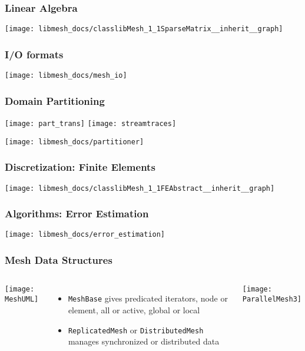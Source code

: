 \frame
{
  \frametitle{Linear Algebra}
  \begin{center}
    \texttt{[image: libmesh\_docs/classlibMesh\_1\_1SparseMatrix\_\_inherit\_\_graph]}
  \end{center}
}



\frame
{
  \frametitle{I/O formats}
  \begin{center}
    \texttt{[image: libmesh\_docs/mesh\_io]}
  \end{center}
}


\frame
{
  \frametitle{Domain Partitioning}
  \begin{center}
    \texttt{[image: part\_trans]}
    \texttt{[image: streamtraces]}
  \end{center}  

  \texttt{[image: libmesh\_docs/partitioner]}
}


\frame
{
  \frametitle{Discretization: Finite Elements}
  \begin{center}
    \texttt{[image: libmesh\_docs/classlibMesh\_1\_1FEAbstract\_\_inherit\_\_graph]}
  \end{center}
}      



\frame
{
  \frametitle{Algorithms: Error Estimation}
  \begin{center}
    \texttt{[image: libmesh\_docs/error\_estimation]}
  \end{center}
}



\begin{frame}
\frametitle{Mesh Data Structures}
\begin{columns}
\begin{center}
\texttt{[image: MeshUML]}
\end{center}
\begin{itemize}
\item \texttt{MeshBase} gives predicated iterators, node or element, all or active, global or local
\item \texttt{ReplicatedMesh} or \texttt{DistributedMesh} manages synchronized or distributed data
\end{itemize}

\texttt{[image: ParallelMesh3]}
\end{columns}

\end{frame}






